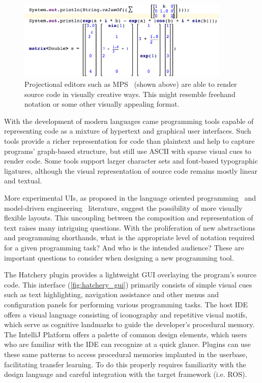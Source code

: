 \documentclass[12pt,initial,twoside,maitrise]{dms}
\numberwithin{equation}{section}
\numberwithin{table}{chapter}
\numberwithin{figure}{chapter}
\begin{document}
\begin{figure}
    \centering
    \includegraphics[width=0.90\textwidth]{../figures/mps_screenshot.png}
    \caption{Projectional editors such as MPS~\citep{voelter2010language, pech2013jetbrains} (shown above) are able to render source code in visually creative ways. This might resemble freehand notation or some other visually appealing format.}
    \label{fig:mps_screenshot}
\end{figure}

With the development of modern languages came programming tools capable of representing code as a mixture of hypertext and graphical user interfaces. Such tools provide a richer representation for code than plaintext and help to capture programs' graph-based structure, but still use ASCII with sparse visual cues to render code. Some tools support larger character sets and font-based typographic ligatures, although the visual representation of source code remains mostly linear and textual.

More experimental UIs, as proposed in the language oriented programming~\citep{dmitriev2004language} and model-driven engineering~\citep{famelis2015mummint} literature, suggest the possibility of more visually flexible layouts. This uncoupling between the composition and representation of text raises many intriguing questions. With the proliferation of new abstractions and programming shorthands, what is the appropriate level of notation required for a given programming task? And who is the intended audience? These are important questions to consider when designing a new programming tool.

The Hatchery plugin provides a lightweight GUI overlaying the program's source code. This interface (\autoref{fig:hatchery_gui}) primarily consists of simple visual cues such as text highlighting, navigation assistance and other menus and configuration panels for performing various programming tasks. The host IDE offers a visual language consisting of iconography and repetitive visual motifs, which serve as cognitive landmarks to guide the developer's procedural memory. The IntelliJ Platform offers a palette of common design elements, which users who are familiar with the IDE can recognize at a quick glance. Plugins can use these same patterns to access procedural memories implanted in the userbase, facilitating transfer learning. To do this properly requires familiarity with the design language and careful integration with the target framework (i.e. ROS).
\end{document}
